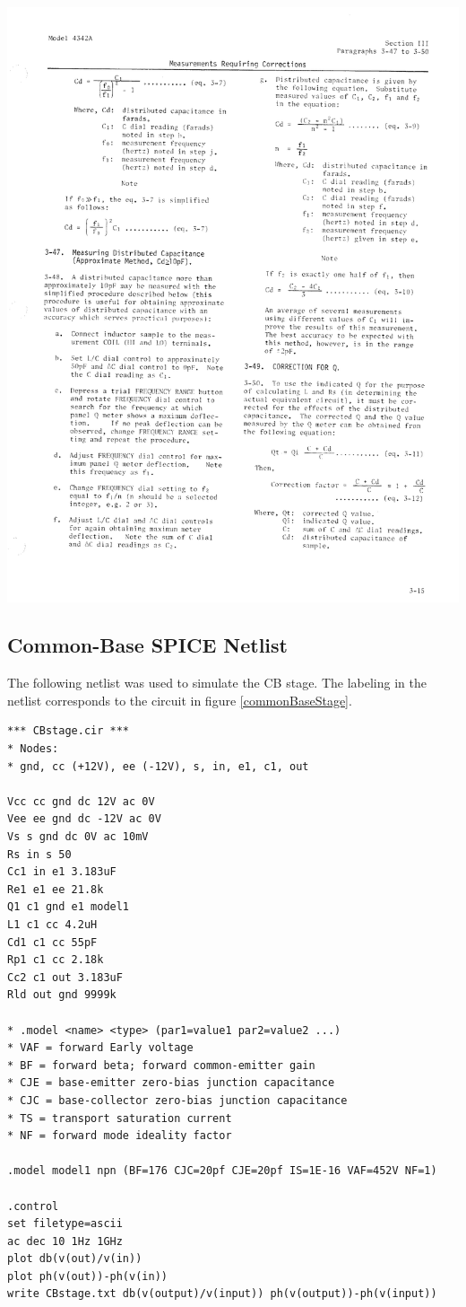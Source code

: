 \documentclass[titlepage, letterpaper, 11pt]{article}
\begin{document}
\includegraphics[width=1\textwidth]{qMeter/page37}

\subsection{Common-Base SPICE Netlist}
\label{CBstageNetlist}

The following netlist was used to simulate the CB stage. The labeling
in the netlist corresponds to the circuit in figure
\ref{commonBaseStage}.

\begin{verbatim}
*** CBstage.cir ***
* Nodes:
* gnd, cc (+12V), ee (-12V), s, in, e1, c1, out

Vcc cc gnd dc 12V ac 0V
Vee ee gnd dc -12V ac 0V
Vs s gnd dc 0V ac 10mV
Rs in s 50
Cc1 in e1 3.183uF
Re1 e1 ee 21.8k
Q1 c1 gnd e1 model1
L1 c1 cc 4.2uH
Cd1 c1 cc 55pF
Rp1 c1 cc 2.18k
Cc2 c1 out 3.183uF
Rld out gnd 9999k

* .model <name> <type> (par1=value1 par2=value2 ...)
* VAF = forward Early voltage
* BF = forward beta; forward common-emitter gain
* CJE = base-emitter zero-bias junction capacitance
* CJC = base-collector zero-bias junction capacitance
* TS = transport saturation current
* NF = forward mode ideality factor

.model model1 npn (BF=176 CJC=20pf CJE=20pf IS=1E-16 VAF=452V NF=1)

.control
set filetype=ascii
ac dec 10 1Hz 1GHz
plot db(v(out)/v(in))
plot ph(v(out))-ph(v(in))
write CBstage.txt db(v(output)/v(input)) ph(v(output))-ph(v(input))
\end{verbatim}
\end{document}
